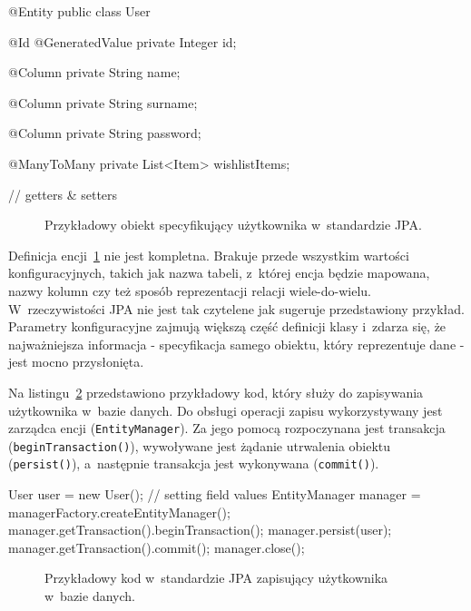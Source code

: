 \begin{verbbox}[\footnotesize]
@Entity
public class User {
    @Id
    @GeneratedValue
    private Integer id;

    @Column
    private String name;

    @Column
    private String surname;

    @Column 
    private String password;

    @ManyToMany
    private List<Item> wishlistItems;

    // getters & setters
}
\end{verbbox}

\begin{figure}[ht!]
	\centering
	\theverbbox
	\caption{Przykładowy obiekt specyfikujący użytkownika w~standardzie JPA.}
	\label{lst:sample_jpa_pojo}
\end{figure}

Definicja encji~\ref{lst:sample_jpa_pojo} nie jest kompletna. Brakuje przede wszystkim wartości konfiguracyjnych, takich jak nazwa tabeli, z~której encja będzie mapowana, nazwy kolumn czy też sposób reprezentacji relacji wiele-do-wielu. W~rzeczywistości JPA nie jest tak czytelene jak sugeruje przedstawiony przykład. Parametry konfiguracyjne zajmują większą część definicji klasy i~zdarza się, że najważniejsza informacja - specyfikacja samego obiektu, który reprezentuje dane - jest mocno przysłonięta.

Na listingu~\ref{lst:sample_jpa_entity_manager} przedstawiono przykładowy kod, który służy do zapisywania użytkownika w~bazie danych. Do obsługi operacji zapisu wykorzystywany jest zarządca encji (\verb+EntityManager+). Za jego pomocą rozpoczynana jest transakcja (\verb+beginTransaction()+), wywoływane jest żądanie utrwalenia obiektu (\verb+persist()+), a~następnie transakcja jest wykonywana (\verb+commit()+).

\begin{verbbox}[\footnotesize]
User user = new User();
// setting field values
EntityManager manager = managerFactory.createEntityManager();
  manager.getTransaction().beginTransaction();
    manager.persist(user);
  manager.getTransaction().commit();
manager.close();
\end{verbbox}

\begin{figure}[ht!]
	\centering
	\theverbbox
	\caption{Przykładowy kod w~standardzie JPA zapisujący użytkownika w~bazie danych.}
	\label{lst:sample_jpa_entity_manager}
\end{figure}

